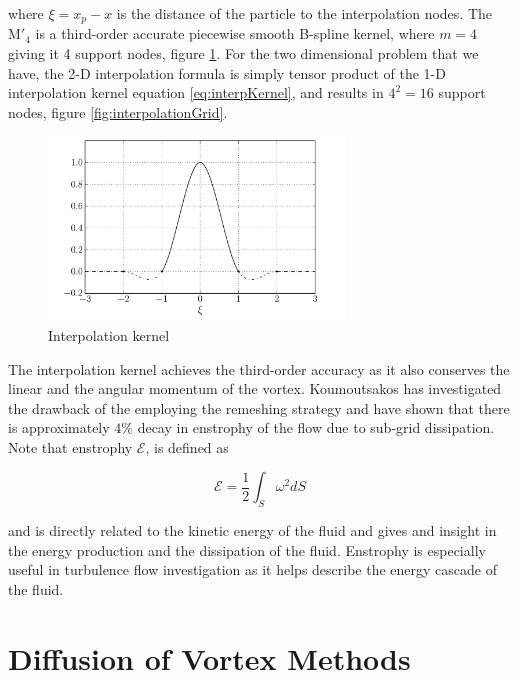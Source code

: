 where $\xi = x_p - x$ is the distance of the particle to the interpolation nodes. The $\mathrm{M'}_4$ is a third-order accurate piecewise smooth B-spline kernel, where $m = 4$ giving it 4 support nodes, figure \ref{fig:interpolationKernel}. For the two dimensional problem that we have, the 2-D interpolation formula is simply tensor product of the 1-D interpolation kernel equation \ref{eq:interpKernel}, and results in $4^2 = 16$ support nodes, figure \ref{fig:interpolationGrid}.

	\begin{figure}[t]
	\centering
	\includegraphics[width=0.7\textwidth]{figures/lagrangian/interpolationKernel.pdf}
	\caption{Interpolation kernel}
	\label{fig:interpolationKernel}
	\end{figure}

The interpolation kernel achieves the third-order accuracy as it also conserves the linear and the angular momentum of the vortex. Koumoutsakos \cite{Koumoutsakos1997} has investigated the drawback of the employing the remeshing strategy and have shown that there is approximately $4\%$ decay in enstrophy of the flow due to sub-grid dissipation. Note that enstrophy $ \mathcal{E}$, is defined as

	\begin{equation}
	\mathcal{E} = \frac{1}{2}\int_S \omega^2 dS
	\end{equation}
	
and is directly related to the kinetic energy of the fluid and gives and insight in the energy production and the dissipation of the fluid. Enstrophy is especially useful in turbulence flow investigation as it helps describe the energy cascade of the fluid.		

\section{Diffusion of Vortex Methods}
\label{sec:diffusionVM}

